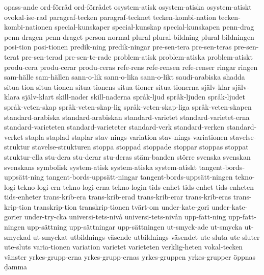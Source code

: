 {opass-ande
ord-förråd
ord-förrådet
osystem-atisk
osystem-atiska
osystem-atiskt
ovokal-ise-rad
paragraf-tecken
paragraf-tecknet
tecken-kombi-nation
tecken-kombi-nationen
special-kunskaper
special-kunskap
special-kunskapen
penn-drag
penn-dragen
penn-draget
person
normal
plural
plural-bildning
plural-bildningen
posi-tion
posi-tionen
predik-ning
predik-ningar
pre-sen-tera
pre-sen-teras
pre-sen-terat
pre-sen-terad
pre-sen-te-rade
problem-atisk
problem-atiska
problem-atiskt
produ-cera
produ-cerar
produ-ceras
refe-rens
refe-rensen
refe-renser
ringar
ringen
sam-hälle
sam-hällen
sann-o-lik
sann-o-lika
sann-o-likt
saudi-arabiska
shadda
situa-tion
situa-tionen
situa-tionens
situa-tioner
situa-tionerna
själv-klar
själv-klara
själv-klart
skill-nader
skill-naderna
språk-ljud
språk-ljuden
språk-ljudet
språk-veten-skap
språk-veten-skap-lig
språk-veten-skap-liga
språk-veten-skapen
standard-arabiska
standard-arabiskan
standard-varietet
standard-varietet-erna
standard-varieteten
standard-varieteter
standard-verk
standard-verken
standard-verket
stapla
staplad
staplar
stav-nings-variation
stav-nings-variationen
stavelse-struktur
stavelse-strukturen
stoppa
stoppad
stoppade
stoppar
stoppas
stoppat
struktur-ella
stu-dera
stu-derar
stu-deras
stäm-banden
större
svenska
svenskan
svenskans
symbolisk
system-atisk
system-atiska
system-atiskt
tangent-bords-uppsätt-ning
tangent-bords-uppsätt-ningar
tangent-bords-uppsätt-ningen
tekno-logi
tekno-logi-ern
tekno-logi-erna
tekno-login
tids-enhet
tids-enhet
tids-enheten
tids-enheter
trans-krib-era
trans-krib-erad
trans-krib-erar
trans-krib-eras
trans-krip-tion
transkrip-tion
transkrip-tionen
tvärt-om
under-kate-gori
under-kate-gorier
under-try-cka
universi-tets-nivå
universi-tets-nivån
upp-fatt-ning
upp-fatt-ningen
upp-sättning
upp-sättningar
upp-sättningen
ut-smyck-ade
ut-smycka
ut-smyckad
ut-smyckat
utbildnings-väsende
utbildnings-väsendet
ute-sluta
ute-sluter
ute-sluts
varia-tionen
variation
varietet
varieteten
verklig-heten
vokal-tecken
vänster
yrkes-grupp-erna
yrkes-grupp-ernas
yrkes-gruppen
yrkes-grupper
öppnas
ḍamma
}
